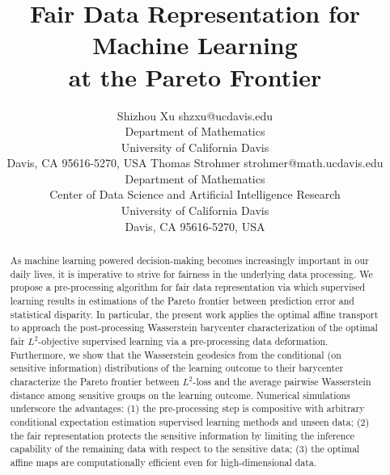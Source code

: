 \documentclass[twoside,11pt]{article}
\begin{document}
\title{Fair Data Representation for Machine Learning \\ at the Pareto Frontier}

\author{\name Shizhou Xu \email shzxu@ucdavis.edu \\
       \addr Department of Mathematics\\
       University of California Davis\\
       Davis, CA 95616-5270, USA
       \AND
       \name Thomas Strohmer \email strohmer@math.ucdavis.edu \\
       \addr Department of Mathematics\\
       Center of Data Science and Artificial Intelligence Research\\
       University of California Davis\\
       Davis, CA 95616-5270, USA}
       

\maketitle

\begin{abstract}%
As machine learning powered decision-making becomes increasingly important in our daily lives, it is imperative to strive for fairness in the underlying data processing. We propose a pre-processing algorithm for fair data representation via which supervised learning results in estimations of the Pareto frontier between prediction error and statistical disparity. In particular, the present work applies the optimal affine transport to approach the post-processing Wasserstein barycenter characterization of the optimal fair $L^2$-objective supervised learning via a pre-processing data deformation. Furthermore, we show that the Wasserstein geodesics from the conditional (on sensitive information) distributions of the learning outcome to their barycenter characterize the Pareto frontier between $L^2$-loss and the average pairwise Wasserstein distance among sensitive groups on the learning outcome. Numerical simulations underscore the advantages: (1) the pre-processing step is compositive with arbitrary conditional expectation estimation supervised learning methods and unseen data; (2) the fair representation protects the sensitive information by limiting the inference capability of the remaining data with respect to the sensitive data; (3) the optimal affine maps are computationally efficient even for high-dimensional data.
\end{abstract}
\end{document}
